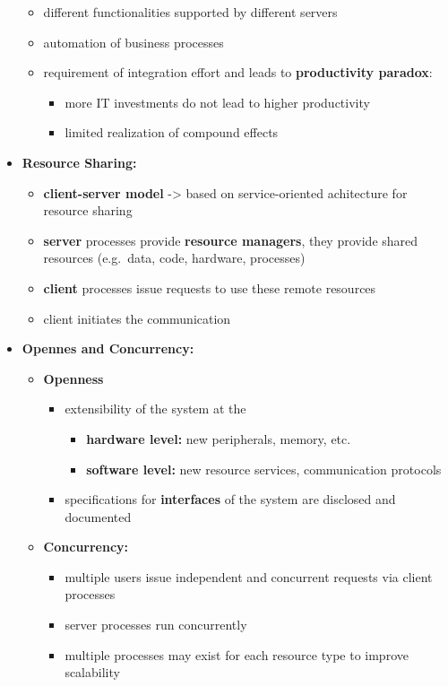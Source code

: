 \documentclass[ieeetran]{article}
\begin{document}
\begin{itemize}
\begin{itemize}
	\item different functionalities supported by different servers
		\item automation of business processes
		\item requirement of integration effort and leads to \textbf{productivity paradox}:
			\begin{itemize}
			  \item more IT investments do not lead to higher productivity
				  \item limited realization of compound effects
			\end{itemize}
	\end{itemize}

\item \textbf{Resource Sharing:}
	\begin{itemize}
	  \item \textbf{client-server model} -> based on service-oriented achitecture for resource sharing
	\item \textbf{server} processes provide \textbf{resource managers}, they provide shared resources (e.g.\ data, code, hardware, processes)
\item \textbf{client} processes issue requests to use these remote resources
\item client initiates the communication
	\end{itemize}

\item \textbf{Opennes and Concurrency:}
	\begin{itemize}
	  \item \textbf{Openness}
		  \begin{itemize}
		    \item extensibility of the system at the
			   \begin{itemize}
			     \item \textbf{hardware level:} new peripherals, memory, etc.
			\item \textbf{software level:} new resource services, communication protocols
			   \end{itemize}
		\item specifications for \textbf{interfaces} of the system are disclosed and documented
		  \end{itemize}

\item \textbf{Concurrency:}
	\begin{itemize}
	  \item multiple users issue independent and concurrent requests via client processes
\item server processes run concurrently
	\item multiple processes may exist for each resource type to improve scalability
	\end{itemize}


\end{itemize}
\end{itemize}
\end{document}

